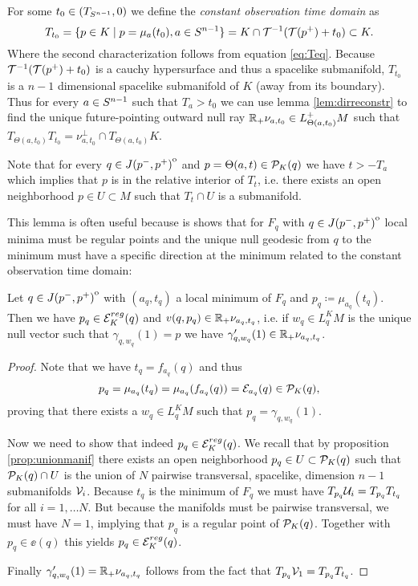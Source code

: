 \begin{definition}\label{def:constobstime} For some $t_0\in (T_{S^{n-1}},0)$ we define the \emph{constant observation time domain} as 
\begin{equation}
    T_{t_0} = \{p\in K \mid p=\mu_a(t_0), a\in {S^{n-1}}\} = K \cap {\mathcal{T}}^{-1}({\mathcal{T}}(p^+)+t_0) \subset K.
\end{equation} 
Where the second characterization follows from equation \eqref{eq:Teq}. Because ${\mathcal{T}}^{-1}({\mathcal{T}}(p^+)+t_0)$ is a cauchy hypersurface and thus a spacelike submanifold, $T_{t_0}$ is a $n-1$ dimensional spacelike submanifold of $K$ (away from its boundary).
Thus for every $a\in {S^{n-1}}$ such that $T_a>t_0$ we can use lemma \ref{lem:dirreconstr} to find the unique future-pointing outward null ray $\mathbb{R}_+\nu_{a,t_0}\in L^+_{\Theta(a,t_0)}M$ such that $T_{\Theta(a,t_0)}T_{t_0} = \nu_{a,t_0}^\perp \cap T_{\Theta(a,t_0)}K$.

Note that for every $q\in {\kern0ptJ(p^-,p^+)}^{\mathrm{o}}$ and $p=\Theta(a,t)\in {\mathcal{P}}_K(q)$ we have $t>-T_a$ which implies that $p$ is in the relative interior of $T_{t}$, i.e. there exists an open neighborhood $p\in U \subset M$ such that $T_t\cap U$ is a submanifold.
\end{definition}

This lemma is often useful because is shows that for $F_q$ with $q\in {\kern0ptJ(p^-,p^+)}^{\mathrm{o}}$ local minima must be regular points and the unique null geodesic from $q$ to the minimum must have a specific direction at the minimum related to the constant observation time domain:
\begin{lemma}\label{lem:amin}
    Let $q\in {\kern0ptJ(p^-,p^+)}^{\mathrm{o}}$ with $(a_q,t_q)$ a local minimum of $F_q$ and $p_q\coloneqq \mu_{a_q}(t_q)$. Then we have $p_q\in {{\mathcal{E}}^{reg}_K}(q)$ and $v(q,p_q)\in \mathbb{R}_+\nu_{a_q,t_q}$, i.e. if $w_q\in L^K_qM$ is the unique null vector such that $\gamma_{q,w_q}(1)=p$ we have $\gamma'_{q,w_q}(1)\in \mathbb{R}_+\nu_{a_q,t_q}$.
\end{lemma}
\begin{proof}
    Note that we have $t_q = f_{a_q}(q)$ and thus 
    \[
        p_q =\mu_{a_q}(t_q) = \mu_{a_q}(f_{a_q}(q)) = {\mathcal{E}}_{a_q}(q)\in {{\mathcal{P}}_K(q)},
    \] proving that there exists a $w_q\in L^K_qM$ such that $p_q = \gamma_{q,w_q}(1)$. 

    Now we need to show that indeed $p_q\in {{\mathcal{E}}^{reg}_K}(q)$.
    We recall that by proposition \ref{prop:unionmanif} there exists an open neighborhood $p_q\in U\subset {\mathcal{P}}_K(q)$ such that ${\mathcal{P}}_K(q)\cap U$ is the union of $N$ pairwise transversal, spacelike, dimension $n-1$ submanifolds ${\mathcal{V}}_i$. Because $t_q$ is the minimum of $F_q$ we must have $T_{p_q}{{\mathcal{U}}_i} = T_{p_q}{T_{t_q}}$ for all $i=1,\dots N$. But because the manifolds must be pairwise transversal, we must have $N=1$, implying that $p_q$ is a regular point of ${\mathcal{P}}_K(q)$. Together with $p_q\in \ee(q)$ this yields $p_q \in {{\mathcal{E}}^{reg}_K}(q)$.

    Finally $\gamma'_{q,w_q}(1)=\mathbb{R}_+\nu_{a_q,t_q}$ follows from the fact that $T_{p_q}{{\mathcal{V}}_1} = T_{p_q}{T_{t_q}}$.
\end{proof}

